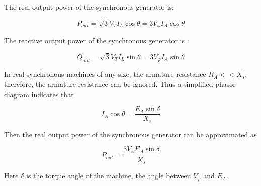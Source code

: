 The real output power of the synchronous generator is:

\begin{equation}\label{eq:7}
P_{out} = \sqrt{3}V_T I_L \cos\theta = 3V_\varphi I_A \cos\theta
\end{equation}

The reactive output power of the synchronous generator is \cite{machinery}:

\begin{equation}\label{eq:8}
Q_{out} = \sqrt{3} V_T I_L \sin\theta = 3V_\varphi I_A \sin\theta
\end{equation}

In real synchronous machines of any size, the armature resistance \begin{math}R_A <<  X_s\end{math}, therefore, the armature resistance can be ignored. Thus a simplified phasor diagram indicates that \cite{machinery}

\begin{equation}\label{eq:9}
I_A \cos\theta = \frac{E_A \sin\delta}{X_s}
\end{equation}

Then the real output power of the synchronous generator can be approximated as \cite{machinery}

\begin{equation}\label{eq:10}
P_{out} = \frac{3 V_\varphi E_A \sin\delta}{X_s}
\end{equation}

Here \begin{math}\delta\end{math} is the torque angle of the machine, the angle between \begin{math}V_\varphi\end{math}  and \begin{math}E_A\end{math}.


